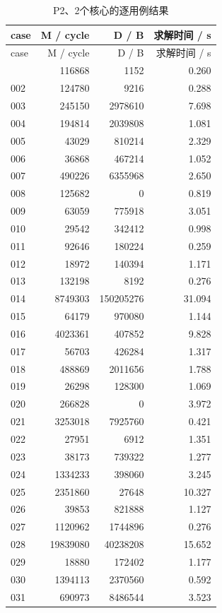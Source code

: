 \documentclass[anonymous,notoc]{gmcm2026}
\begin{document}
\begin{longtable}{lrrr}
\caption{P2、2个核心的逐用例结果}\\
\toprule
case & M / cycle & D / B & 求解时间 / s\\\midrule
\endfirsthead
\toprule
case & M / cycle & D / B & 求解时间 / s\\\midrule
\endhead
\bottomrule\endfoot
001 & 116868 & 1152 & 0.260 \\
002 & 124780 & 9216 & 0.288 \\
003 & 245150 & 2978610 & 7.698 \\
004 & 194814 & 2039808 & 1.081 \\
005 & 43029 & 810214 & 2.329 \\
006 & 36868 & 467214 & 1.052 \\
007 & 490226 & 6355968 & 2.650 \\
008 & 125682 & 0 & 0.819 \\
009 & 63059 & 775918 & 3.051 \\
010 & 29542 & 342412 & 0.998 \\
011 & 92646 & 180224 & 0.259 \\
012 & 18972 & 140394 & 1.171 \\
013 & 132198 & 8192 & 0.276 \\
014 & 8749303 & 150205276 & 31.094 \\
015 & 64179 & 970080 & 1.144 \\
016 & 4023361 & 407852 & 9.828 \\
017 & 56703 & 426284 & 1.317 \\
018 & 488869 & 2011656 & 1.788 \\
019 & 26298 & 128300 & 1.069 \\
020 & 266828 & 0 & 3.972 \\
021 & 3253018 & 7925760 & 0.421 \\
022 & 27951 & 6912 & 1.351 \\
023 & 38173 & 739322 & 1.277 \\
024 & 1334233 & 398060 & 3.245 \\
025 & 2351860 & 27648 & 10.327 \\
026 & 39853 & 821888 & 1.127 \\
027 & 1120962 & 1744896 & 0.276 \\
028 & 19839080 & 40238208 & 15.652 \\
029 & 18880 & 172402 & 1.177 \\
030 & 1394113 & 2370560 & 0.592 \\
031 & 690973 & 8486544 & 3.523 \\

\end{longtable}
\end{document}
